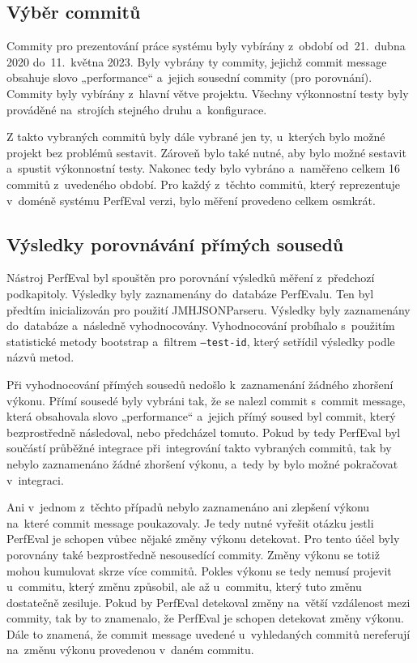 \subsection{Výběr commitů}

Commity pro prezentování práce systému byly vybírány z~období od~21.~dubna 2020 do~11.~května 2023.
Byly vybrány ty commity, jejichž commit message obsahuje slovo „performance“ a~jejich sousední commity (pro porovnání).
Commity byly vybírány z~hlavní větve projektu. Všechny výkonnostní testy byly prováděné na~strojích stejného druhu a~konfigurace.

Z takto vybraných commitů byly dále vybrané jen ty, u~kterých bylo možné projekt bez problémů sestavit. Zároveň bylo také nutné,
aby bylo možné sestavit a~spustit výkonnostní testy. Nakonec tedy bylo vybráno a~naměřeno celkem 16 commitů z~uvedeného období.
Pro každý z~těchto commitů, který reprezentuje v~doméně systému PerfEval verzi, bylo měření provedeno celkem osmkrát.

\subsection{Výsledky porovnávání přímých sousedů}

Nástroj PerfEval byl spouštěn pro porovnání výsledků měření z~předchozí podkapitoly. Výsledky byly zaznamenány do~databáze PerfEvalu.
Ten byl předtím inicializován pro použití JMHJSONParseru. Výsledky byly zaznamenány do~databáze a~následně vyhodnocovány.
Vyhodnocování probíhalo s~použitím statistické metody bootstrap a~filtrem \texttt{--test-id}, který setřídil výsledky podle
názvů metod.

Při vyhodnocování přímých sousedů nedošlo k~zaznamenání žádného zhoršení výkonu. Přímí sousedé byly vybráni tak, že
se nalezl commit s~commit message, která obsahovala slovo „performance“ a~jejich přímý soused byl commit, který bezprostředně následoval, nebo předcházel tomuto.
Pokud by tedy PerfEval byl součástí průběžné integrace při~integrování takto vybraných commitů, tak by nebylo zaznamenáno žádné zhoršení výkonu,
a~tedy by bylo možné pokračovat v~integraci.

Ani v~jednom z~těchto případů nebylo zaznamenáno ani zlepšení výkonu na~které commit message poukazovaly.
Je tedy nutné vyřešit otázku jestli PerfEval je schopen vůbec nějaké změny výkonu detekovat.
Pro tento účel byly porovnány také bezprostředně nesousedící commity. Změny výkonu se totiž mohou kumulovat skrze více commitů.
Pokles výkonu se tedy nemusí projevit u~commitu, který změnu způsobil, ale až u~commitu, který tuto změnu dostatečně zesiluje.
Pokud by PerfEval detekoval změny na~větší vzdálenost mezi commity, tak by to znamenalo, že PerfEval je schopen detekovat změny výkonu.
Dále to znamená, že commit message uvedené u~vyhledaných commitů nereferují na~změnu výkonu provedenou v~daném commitu.

